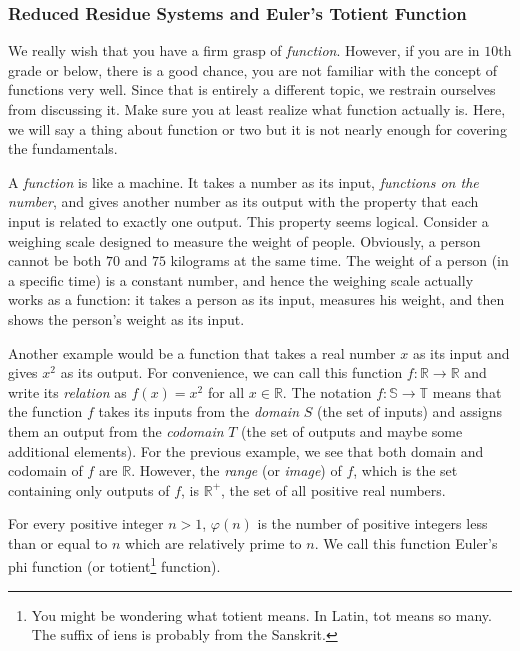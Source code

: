 \documentclass{subfile}
\begin{document}
	\subsubsection{Reduced Residue Systems and Euler's Totient Function}
	We really wish that you have a firm grasp of \textit{function}. However, if you are in $10$th grade or below, there is a good chance, you are not familiar with the concept of functions very well. Since that is entirely a different topic, we restrain ourselves from discussing it. Make sure you at least realize what function actually is. Here, we will say a thing about function or two but it is not nearly enough for covering the fundamentals.

	A \textit{function} is like a machine. It takes a number as its input, \textit{functions on the number}, and gives another number as its output with the property that each input is related to exactly one output. This property seems logical. Consider a weighing scale designed to measure the weight of people. Obviously, a person cannot be both $70$ and $75$ kilograms at the same time. The weight of a person (in a specific time) is a constant number, and hence the weighing scale actually works as a function: it takes a person as its input, measures his weight, and then shows the person's weight as its input.

	Another example would be a function that takes a real number $x$ as its input and gives $x^2$ as its output. For convenience, we can call this function $f: \mathbb R \to \mathbb R$ and write its \textit{relation} as $f(x) = x^2$ for all $x \in \mathbb R$. The notation $f: \mathbb S \to \mathbb T$ means that the function $f$ takes its inputs from the \textit{domain} $S$ (the set of inputs) and assigns them an output from the \textit{codomain} $T$ (the set of outputs and maybe some additional elements). For the previous example, we see that both domain and codomain of $f$ are $\mathbb R$. However, the \textit{range} (or \textit{image}) of $f$, which is the set containing only outputs of $f$, is $\mathbb R^{+}$, the set of all positive real numbers.

	\begin{definition}\label{def:totient}
		For every positive integer $n>1$, $\varphi(n)$ is the number of positive integers less than or equal to $n$ which are relatively prime to $n$. We call this function Euler's phi function (or totient\footnote{You might be wondering what {totient} means. In Latin, {tot} means so many. The suffix of {iens} is probably from the Sanskrit.} function).
	\end{definition}
\end{document}
